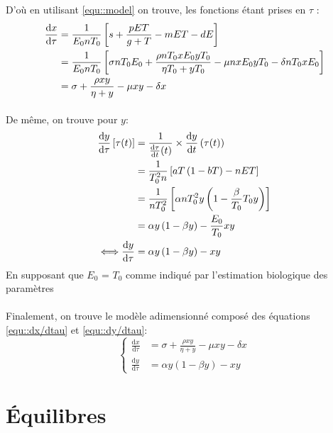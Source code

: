 \documentclass[12pt]{article}
\newcommand{\deriv}{\mathrm{d}}
\newcommand{\dt}[1]{\frac{\deriv #1}{\deriv t}}
\newcommand{\dtau}[1]{\frac{\deriv #1}{\deriv \tau}}
\begin{document}
D'où en utilisant \ref{equ::model} on trouve, les fonctions étant prises en $\tau$ :
\begin{align}
    \dtau{x} &= \frac{1}{E_0nT_0}\left[s + \frac{pET}{g+T}-mET -dE\right]  \notag\\
    &= \frac{1}{E_0nT_0}\left[
    \sigma n T_0 E_0 + \frac{\rho n T_0 x E_0 y T_0}{\eta T_0 + y T_0} -\mu n x E_0 y T_0 -\delta n T_0 x E_0
    \right] \notag\\
    &= \sigma + \frac{\rho xy}{\eta+y}-\mu xy -\delta x 
    \label{equ::dx/dtau}
\end{align}

\paragraph{}De même, on trouve pour $y$:
\begin{align}
    \dtau{y}\left[\tau(t)\right] &= \frac{1}{\dt{\tau}(t)}\times \dt{y}\left(\tau(t)\right) \notag\\
    &= \frac{1}{T_0^2n} \left[aT\left(1-bT\right)-nET \right]\notag\\
    &= \frac{1}{nT_0^2}\left[\alpha n T_0^2 y \left(1 - \frac{\beta}{T_0}T_0y\right)\right] \notag\\
    &= \alpha y \left(1-\beta y \right) -\frac{E_0}{T_0}xy\notag\\
    \Longleftrightarrow{} \dtau{y} &= \alpha y \left(1-\beta y \right) -xy \label{equ::dy/dtau}
\end{align}
En supposant que $E_0$ = $T_0$ comme indiqué par l'estimation biologique des paramètres


\paragraph{}Finalement, on trouve le modèle adimensionné composé des équations \ref{equ::dx/dtau} et \ref{equ::dy/dtau}:
\begin{equation}
    \left\{
    \begin{aligned}
        \dtau{x} &= \sigma + \frac{\rho xy}{\eta+y}-\mu xy -\delta x \\
        \dtau{y} &= \alpha y \left(1-\beta y \right) -xy
    \end{aligned}
    \right. \label{equ::modele_adimensionne}
\end{equation}


\section{Équilibres}
\end{document}
